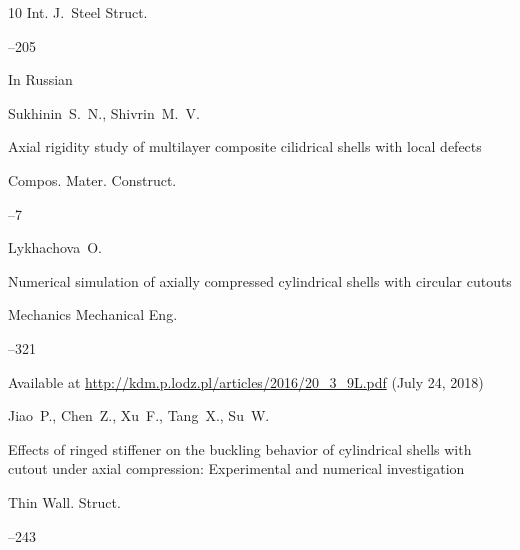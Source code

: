 \begin{thebibliography}{10}
\jour Int. J.~Steel Struct.




–205






\lang In Russian

\by Sukhinin~S.~N., Shivrin~M.~V.

\paper Axial rigidity study of multilayer composite cilidrical shells with local defects

\jour Compos. Mater. Construct.



--7




\by Lykhachova~O.

\paper Numerical simulation of axially compressed cylindrical shells with circular cutouts

\jour Mechanics Mechanical Eng.




--321

\elink Available at \url{http://kdm.p.lodz.pl/articles/2016/20_3_9L.pdf} (July 24, 2018)






\by Jiao~P., Chen~Z., Xu~F., Tang~X., Su~W.

\paper Effects of ringed stiffener on the buckling behavior of cylindrical shells with cutout under axial compression: Experimental and numerical investigation

\jour Thin Wall. Struct.



--243







\end{thebibliography}
